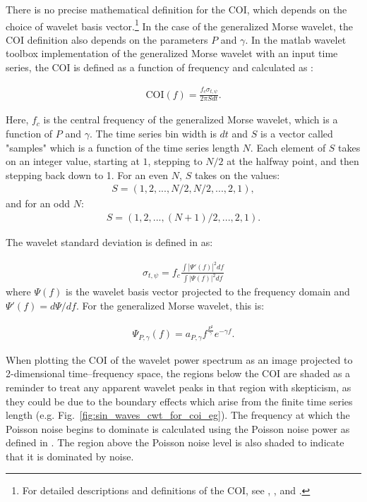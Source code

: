 \documentclass[fleqn,usenatbib]{mnras}
\begin{document}
There is no precise mathematical definition for the COI, which depends on the choice of wavelet basis vector.\footnote{For detailed descriptions and definitions of the COI, see \cite{torrence1998}, \cite{nobach2007review}, and \cite{lilly2017element}.} In the case of the generalized Morse wavelet, the COI definition also depends on the parameters $P$ and $\gamma$.  In the {\sc matlab} {\sc wavelet toolbox} implementation of the generalized Morse wavelet with an input time series, the COI is defined as a function of frequency and calculated as \citep{misiti1996wavelet}:

\begin{align}
    \text{COI}(f) = \frac{f_c \sigma_{t,\psi}}{2\pi S dt}.
\end{align}

Here, $f_c$ is the central frequency of the generalized Morse wavelet, which is a function of $P$ and $\gamma$. The time series bin width is $dt$ and $S$ is a vector called "samples" which is a function of the time series length $N$. Each element of $S$ takes on an integer value, starting at $1$, stepping to $N/2$ at the halfway point, and then stepping back down to 1. For an even $N$, $S$ takes on the values: 
\begin{align}
    S = (1,2,...,N/2,N/2,...,2,1),
\end{align}
and for an odd $N$:
\begin{align}
    S = (1, 2, ...,(N + 1)/2, ..., 2, 1).
\end{align}

The wavelet standard deviation is defined in \citet{lilly2008_morse_wavelets} as:

\begin{align}
    \sigma_{t,\psi} = f_c \frac{\int |\Psi'(f)|^2 df}{\int |\Psi(f)|^2 df}
\end{align}
where $\Psi(f)$ is the wavelet basis vector projected to the frequency domain and $\Psi'(f) = d\Psi/df$. For the generalized Morse wavelet, this is:

\begin{align}
    \Psi_{P,\gamma} (f) = a_{P,\gamma} f^{\frac{P^2}{\gamma}} e^{- \gamma f}.
\end{align}

When plotting the COI of the wavelet power spectrum as an image projected to 2-dimensional time--frequency space, the regions below the COI are shaded as a reminder to treat any apparent wavelet peaks in that region with skepticism, as they could be due to the boundary effects which arise from the finite time series length (e.g. Fig.~\ref{fig:sin_waves_cwt_for_coi_eg}). The frequency at which the Poisson noise begins to dominate is calculated using the Poisson noise power as defined in \citet{uttley2014}.  The region above the Poisson noise level is also shaded to indicate that it is dominated by noise. 
\end{document}
